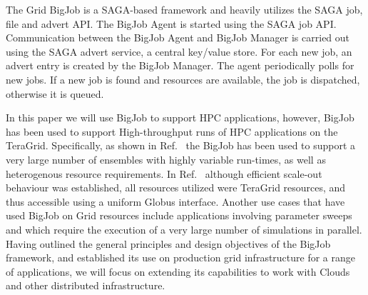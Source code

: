 \documentclass[conference,final]{IEEEtran}
\newcommand{\jhanote}[1]{ {\textcolor{red} { ***SJ: #1 }}}
\newcommand{\jhanote}[1]{}
\begin{document}
The Grid BigJob is a SAGA-based framework and heavily utilizes the
SAGA job, file and advert API. The BigJob Agent is started using the
SAGA job API.  Communication between the BigJob Agent and BigJob
Manager is carried out using the SAGA advert service, a central
key/value store. For each new job, an advert entry is created by the
BigJob Manager. The agent periodically polls for new jobs. If a new
job is found and resources are available, the job is dispatched,
otherwise it is queued.


In this paper we will use BigJob to support HPC applications, however,
BigJob has been used to support High-throughput runs of HPC
applications on the TeraGrid. Specifically, as shown in
Ref.~\cite{enkf-gmac09} the BigJob has been used to support a very
large number of ensembles with highly variable run-times, as well as
heterogenous resource requirements.  In Ref.~\cite{repex_ptrs}
although efficient scale-out behaviour was established, all resources
utilized were TeraGrid resources, and thus accessible using a uniform
Globus interface. Another use cases that have used BigJob on Grid
resources include applications involving parameter sweeps and which
require the execution of a very large number of simulations in
parallel.  Having outlined the general principles and design
objectives of the BigJob framework, and established its use on
production grid infrastructure for a range of applications, we will
focus on extending its capabilities to work with Clouds and other
distributed infrastructure.


\end{document}
